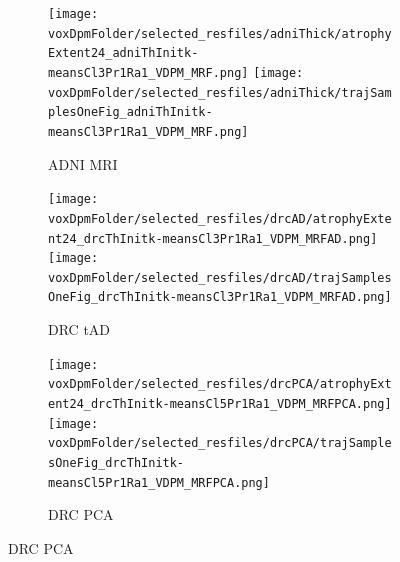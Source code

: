 \begin{figure}
  \centering
  \vspace{-1em}

  \begin{subfigure}[b]{0.45\textwidth}
   \centering
  \vspace{1em}
  \end{subfigure}
  
  

  \begin{subfigure}[b]{\textwidth}
   \centering
  \texttt{[image: \\voxDpmFolder/selected\_resfiles/adniThick/atrophyExtent24\_adniThInitk-meansCl3Pr1Ra1\_VDPM\_MRF.png]} \texttt{[image: \\voxDpmFolder/selected\_resfiles/adniThick/trajSamplesOneFig\_adniThInitk-meansCl3Pr1Ra1\_VDPM\_MRF.png]}
    \caption{ADNI MRI}
    \label{diveClustAdniMri}
  \end{subfigure}

  \begin{subfigure}[b]{\textwidth}
   \centering
  \texttt{[image: \\voxDpmFolder/selected\_resfiles/drcAD/atrophyExtent24\_drcThInitk-meansCl3Pr1Ra1\_VDPM\_MRFAD.png]} \texttt{[image: \\voxDpmFolder/selected\_resfiles/drcAD/trajSamplesOneFig\_drcThInitk-meansCl3Pr1Ra1\_VDPM\_MRFAD.png]}
    \caption{DRC tAD}
    \label{diveClustDrcAd}
  \end{subfigure}
  
  \begin{subfigure}[b]{\textwidth}
   \centering
  \texttt{[image: \\voxDpmFolder/selected\_resfiles/drcPCA/atrophyExtent24\_drcThInitk-meansCl5Pr1Ra1\_VDPM\_MRFPCA.png]} \texttt{[image: \\voxDpmFolder/selected\_resfiles/drcPCA/trajSamplesOneFig\_drcThInitk-meansCl5Pr1Ra1\_VDPM\_MRFPCA.png]}
    \caption{DRC PCA}
    \label{diveClustDrcPca}
  \end{subfigure}
  

\end{figure}

